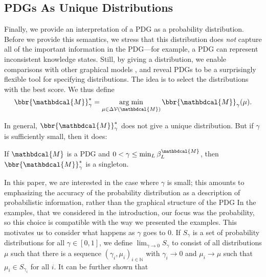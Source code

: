 \documentclass[letterpaper]{article} %
\theoremstyle{plain}
\theoremstyle{definition}
\theoremstyle{remark}
\newcommand{\begthm}[3][]{\begin{#2}[{name=#1},restate=#3,label=#3]}
\DeclareMathOperator*{\argmin}{arg\;min}
\newcommand{\V}{\mathcal V}
\newcommand{\dg}[1]{\mathbdcal{#1}}
\begin{document}
\subsection{PDGs As Unique Distributions}\label{sec:uniq-dist-semantics}

Finally, we provide an interpretation of a PDG as a probability distribution.
Before we provide this semantics, we stress that this distribution does
\emph{not} capture all of the important information in the PDG---for example, a
PDG can represent inconsistent knowledge states.  Still, by giving a
distribution, we enable comparisons with other graphical models%
, and reveal PDGs to be
a surprisingly flexible tool for specifying distributions.  
The idea is to select the distributions with the best score. 
We thus define 
\begin{equation}
	\bbr{\dg M}_\gamma^* = \argmin_{\mu \in \Delta\V(\dg M)} \bbr{\dg M}_\gamma(\mu).
\end{equation}   

In general, $\bbr{\dg M}_\gamma^*$ does not give a unique distribution.  But if
$\gamma$ is sufficiently small, then it does:

\begthm{prop}{prop:sem3}
	If $\dg M$ is a PDG and $0 < \gamma \leq \min_L \beta_L^{\dg M}$, then
	$\bbr{\dg M}_\gamma^*$ is a singleton. 
\end{prop}

In this paper, we are interested in the case where $\gamma$ is small;
this amounts to emphasizing the accuracy of the probability
distribution as a description of probabilistic information,
rather than the graphical structure of the PDG%
In the examples, that we considered in the introduction, our focus was
the probability, so this choice is compatible with the way we
presented the examples.
This motivates us to consider
what happens as $\gamma$ goes to 0.  If $S_\gamma$ is a set of
probability distributions for all $\gamma \in [0,1]$, we define $\lim_{\gamma
\rightarrow 0} S_\gamma$ to consist of all distributions $\mu$ such that there
is a sequence $(\gamma_i, \mu_i)_{i \in \mathbb N}$ with $\gamma_i \to 0$ and
$\mu_i \to \mu$ such that $\mu_i \in S_{\gamma_i}$ for all $i$. 
It can be further shown that 
\end{document}
